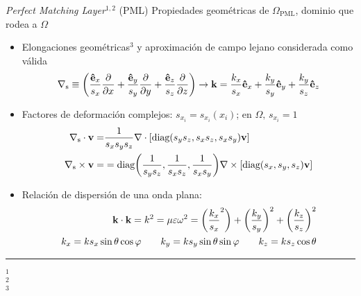 \begin{frame}{\textit{Perfect Matching Layer}$^{1,2}$ (PML)}
{Propiedades geométricas de $\Omega_\text{PML}$, dominio que rodea a $\Omega$}

\begin{itemize}
    \item Elongaciones geométricas$^3$ y aproximación de campo lejano considerada como válida
         \begin{align*}
         \nabla_\text{s} \equiv \qty(\frac{\vu{e}_x }{s_x}\pdv{x} + \frac{\vu{e}_y}{s_y}\pdv{y} + \frac{\vu{e}_z}{s_z}\pdv{z}) \to \vb{k} = \frac{k_x}{s_x}\vu{e}_x + \frac{k_y}{s_y}\vu{e}_y  +\frac{k_y}{s_z}\vu{e}_z
     \end{align*}
%
    \item Factores de deformación complejos:  $s_{x_i} = s_{x_i}(x_i)$; en $\Omega,\, s_{x_i} = 1$
        \begin{align*}
        \nabla_\text{s}\cdot \vb{v} =&
                   \frac{1}{s_x s_y s_z} \nabla\cdot \qty[\text{diag}(s_y s_z,s_x s_z,s_x s_y)\vb{v}]
         \\
        \nabla_\text{s}\times \vb{v} =& %
                                     = \text{diag}\qty(\frac{1}{s_y s_z},\frac{1}{s_x s_z},\frac{1}{s_x s_y}) \nabla\times
                                     \qty[\text{diag}(s_x,s_y,s_z) \vb{v}]
        \end{align*}
    \item Relación de dispersión de una onda plana:
        \begin{align*}
        \vb{k} \cdot \vb{k}  = k^2 = \mu\varepsilon\omega^2 =
            \qty(\frac{k_x}{s_x}^2 )+ \qty(\frac{k_y}{s_y})^2 + \qty(\frac{k_z}{s_z})^2\\
        k_x = k s_x \sin\theta\cos\varphi \qquad
            k_y = k s_y \sin\theta\sin\varphi \qquad
                k_z = k s_z \cos\theta
        \end{align*}
\end{itemize}
%
	\noindent\rule{.25\textwidth}{0.4pt}
 \begin{spacing}{0}\fontsize{4}{12} \selectfont
	$^1$ \\
	$^2$ \\
	$^3$ 
	\end{spacing}
\end{frame}

